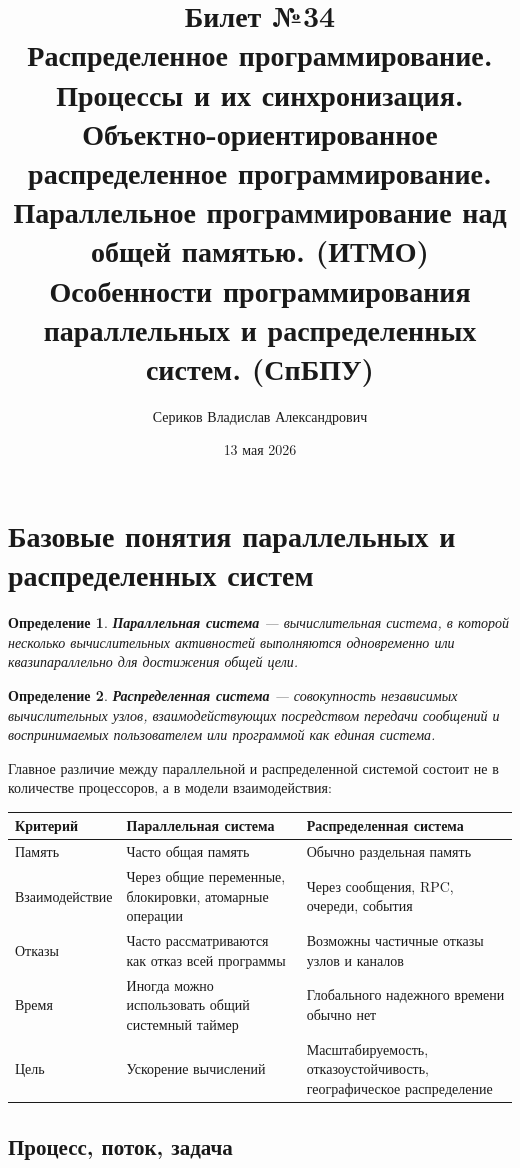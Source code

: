 \documentclass[12pt,a4paper]{article}
\title{Билет №34 \\ \small Распределенное программирование. Процессы и их синхронизация. Объектно-ориентированное распределенное программирование. Параллельное программирование над общей памятью. (ИТМО) \\ Особенности программирования параллельных и распределенных систем. (СпБПУ)}
\author{Сериков Владислав Александрович}
\date{13 мая 2026}
\newtheorem{definition}{Определение}
\begin{document}
\maketitle
\tableofcontents
\newpage

\section{Базовые понятия параллельных и распределенных систем}

\begin{definition}
\textbf{Параллельная система} --- вычислительная система, в которой несколько вычислительных активностей выполняются одновременно или квазипараллельно для достижения общей цели.
\end{definition}

\begin{definition}
\textbf{Распределенная система} --- совокупность независимых вычислительных узлов, взаимодействующих посредством передачи сообщений и воспринимаемых пользователем или программой как единая система.
\end{definition}

Главное различие между параллельной и распределенной системой состоит не в количестве процессоров, а в модели взаимодействия:

\begin{center}
\begin{tabular}{p{}p{}p{}}
\toprule
\textbf{Критерий} & \textbf{Параллельная система} & \textbf{Распределенная система} \\
\midrule
Память & Часто общая память & Обычно раздельная память \\
Взаимодействие & Через общие переменные, блокировки, атомарные операции & Через сообщения, RPC, очереди, события \\
Отказы & Часто рассматриваются как отказ всей программы & Возможны частичные отказы узлов и каналов \\
Время & Иногда можно использовать общий системный таймер & Глобального надежного времени обычно нет \\
Цель & Ускорение вычислений & Масштабируемость, отказоустойчивость, географическое распределение \\
\bottomrule
\end{tabular}
\end{center}

\subsection{Процесс, поток, задача}
\end{document}

